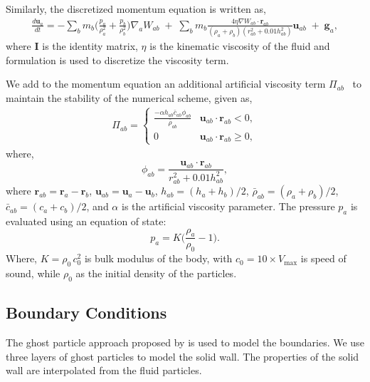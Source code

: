\documentclass[preprint,12pt]{elsarticle}
\newcommand{\todoin}{\todo[inline]}
\newcommand{\ten}[1]{\ensuremath{\mathbf{#1}}}
\begin{document}
%
Similarly, the discretized momentum equation is written as,
\begin{multline}
  \label{eq:sph-momentum-fluid}
  \frac{{d}\ten{u}_{a}}{dt} = - \sum_{b} m_b
  \bigg(\frac{p_a}{\rho_a^2} + \frac{p_b}{\rho_b^2}\bigg)
  \nabla_{a} W_{ab}
 \;+\;
  \sum_{b} m_b \frac{4 \eta \nabla W_{ab}\cdot
    \ten{r}_{ab}}{(\rho_a + \rho_b) (r_{ab}^2 + 0.01 h_{ab}^2)} \ten{u}_{ab}  \;+\;
  \ten{g}_{a},
\end{multline}
where $\ten{I}$ is the identity matrix, $\eta$ is the kinematic viscosity of the
fluid and \todoin{\cite{morris1997modeling}} formulation is used to discretize the
viscosity term.

We add to the momentum equation an additional artificial viscosity term
$\Pi_{ab}$~\cite{monaghan-review:2005} to maintain the stability of the
numerical scheme, given as,
\begin{align}
  \label{eq:mom-av}
  \Pi_{ab} =
  \begin{cases}
\frac{-\alpha h_{ab} \bar{c}_{ab} \phi_{ab}}{\bar{\rho}_{ab}}
  & \ten{u}_{ab}\cdot \ten{r}_{ab} < 0, \\
  0 & \ten{u}_{ab}\cdot \ten{r}_{ab} \ge 0,
\end{cases}
\end{align}
where,
%
\begin{equation}
  \label{eq:av-phiij}
  \phi_{ab} = \frac{\ten{u}_{ab} \cdot \ten{r}_{ab}}{r^2_{ab} + 0.01 h^2_{ab}},
\end{equation}
%
where $\ten{r}_{ab} = \ten{r}_a - \ten{r}_b$,
$\ten{u}_{ab} = \ten{u}_a - \ten{u}_b$, $h_{ab} = (h_a + h_b)/2$,
$\bar{\rho}_{ab} = (\rho_a + \rho_b)/2$, $\bar{c}_{ab} = (c_a + c_b) / 2$, and
$\alpha$ is the artificial viscosity parameter.  The pressure $p_a$ is evaluated
using an equation of state:
\begin{equation}
\label{eqn:sph-eos}
  p_a = K \bigg(\frac{\rho_a}{\rho_{0}} - 1 \bigg).
\end{equation}
Where, $K=\rho_0 \, c_0^2$ is bulk modulus of the body, with
$c_0=10 \times V_{\text{max}}$ is speed of sound, while $\rho_0$ as the
initial density of the particles.


\FloatBarrier%
\subsection{Boundary Conditions}
\label{sec:boundary_conditions}

The ghost particle approach proposed by \citet{Adami2012} is used to model the
boundaries. We use three layers of ghost particles to model the solid wall.
The properties of the solid wall are interpolated from the fluid particles.
\end{document}
